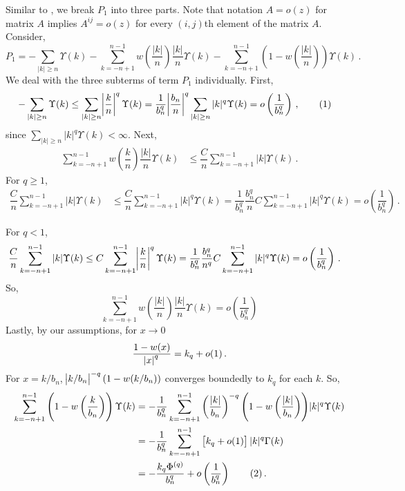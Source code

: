 \documentclass[11pt]{article}
\newcommand\numberthis{\addtocounter{equation}{1}\tag{\theequation}}
\theoremstyle{remark}
\begin{document}
%
Similar to \cite{hannan2009multiple}, we break $P_1$ into three parts. Note that notation $A = o(z)$ for matrix $A$  implies $A^{ij} = o(z)$ for every $(i,j)$th element of the matrix $A$. Consider,
\begin{equation}
\label{eq:P1_decomp}
P_1 = -\sum_{|k|\geq n}\Upsilon(k)  -  \sum_{k = -n+1}^{n-1}w\left(\dfrac{|k|}{n}\right)\dfrac{|k|}{n}\Upsilon(k)- \sum_{k = -n+1}^{n-1}\left(1-w\left(\dfrac{|k|}{n}\right)\right)\Upsilon(k)\,.  
\end{equation}
%
We deal with the three subterms of term $P_1$ individually. First,
%    
\begin{align*}
 {-\sum_{|k|\geq n}\Upsilon(k)} &\leq  \sum_{|k|\geq n} \abs{\dfrac{k}{n}}^q   \Upsilon(k) = \dfrac{1}{b_n^q}\abs{\dfrac{b_n}{n}}^q \sum_{|k|\geq n}|k|^q  \Upsilon(k) = o\left(\dfrac{1}{b_n^q}\right)\,, \numberthis \label{eq:P1_first}
\end{align*}
%
since $\sum_{|k|\geq n}|k|^q \Upsilon(k)  < \infty$. Next,
%
\begin{align*}
 \sum_{k = -n+1}^{n-1}w\left(\dfrac{k}{n}\right)\dfrac{|k|}{n}\Upsilon(k)   &\leq \dfrac{C}{n}\sum_{k = -n+1}^{n-1}|k|  \Upsilon(k)  \,.
\end{align*}
For $q\geq 1$,
\begin{align*}
\dfrac{C}{n}\sum_{k = -n+1}^{n-1}|k|  \Upsilon(k) &\leq \dfrac{C}{n}\sum_{k = -n+1}^{n-1}|k|^q  \Upsilon(k) = \dfrac{1}{b_n^q}\dfrac{b_n^q}{n} C\sum_{k = -n+1}^{n-1}|k|^q  \Upsilon(k)  = o\left(\dfrac{1}{b_n^q}\right)\,.
\end{align*}
          
For $q <1$,
\begin{align*}
   \dfrac{C}{n}\sum_{k = -n+1}^{n-1}|k|  \Upsilon(k)  &\leq C\sum_{k =-n+1}^{n-1}\abs{\dfrac{k}{n}}^q  \Upsilon(k)  = \dfrac{1}{b_n^q}\dfrac{b_n^q}{n^q} C \sum_{k =-n+1}^{n-1}|k|^q \Upsilon(k)  = o\left(\dfrac{1}{b_n^q}\right) \, .
\end{align*}
So,
\begin{equation}
\label{eq:P1_second}
 \sum_{k = -n+1}^{n-1}w\left(\dfrac{|k|}{n}\right)\dfrac{|k|}{n}\Upsilon(k) = o \left(\dfrac{1}{b_n^q} \right)
\end{equation}
Lastly, by our assumptions, for $x \to 0$
\[
\dfrac{1 - w(x)}{\abs{x}^q} = k_q + o(1)\,.
\]
For $x = k/b_n$, $\abs{k/b_n}^{-q}(1-w(k/b_n))$ converges boundedly to $k_q$ for each $k$.
So,
\begin{align*}
     \sum_{k = -n+1}^{n-1}\left(1-w\left(\dfrac{k}{b_n}\right)\right)\Upsilon(k) &= -\dfrac{1}{b_n^q}\sum_{k = -n+1}^{n-1}  \left(\dfrac{|k|}{b_n}\right)^{-q} {\left(1-w\left(\dfrac{|k|}{b_n}\right)\right)}|k|^q \Upsilon(k) \\
     & = -\dfrac{1}{b_n^q}\sum_{k = -n+1}^{n-1}   \left[k_q + o(1) \right]|k|^q \Gamma(k) \\
     & = -\dfrac{k_q \Phi^{(q)} }{b_n^q} + o\left( \dfrac{1}{b_n^q} \right) \numberthis \label{eq:P1_third}\,.
\end{align*}
\end{document}
